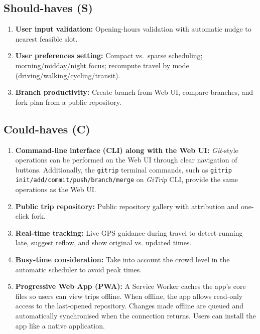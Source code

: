 \documentclass{article}
\begin{document}
\subsection*{Should-haves (S)}
\begin{enumerate}[label=\textbf{S\arabic*}]
  \item \textbf{User input validation:} Opening-hours validation with automatic nudge to nearest feasible slot.
  \item \textbf{User preferences setting:} Compact vs.\ sparse scheduling; morning/midday/night focus; recompute travel by mode (driving/walking/cycling/transit).
  \item \textbf{Branch productivity:} Create branch from Web UI, compare branches, and fork plan from a public repository.
\end{enumerate}

\subsection*{Could-haves (C)}
\begin{enumerate}[label=\textbf{C\arabic*}]
  \item \textbf{Command-line interface (CLI) along with the Web UI:} \textit{Git}-style operations can be performed on the Web UI through clear navigation of buttons. Additionally, the \texttt{gitrip} terminal commands, such as \texttt{gitrip init/add/commit/push/branch/merge} on \textit{GiTrip} CLI, provide the same operations as the Web UI.
  \item \textbf{Public trip repository:} Public repository gallery with attribution and one-click fork.
  \item \textbf{Real-time tracking:} Live GPS guidance during travel to detect running late, suggest reflow, and show original vs. updated times.
  \item \textbf{Busy-time consideration:} Take into account the crowd level in the automatic scheduler to avoid peak times.
  \item \textbf{Progressive Web App (PWA):} A Service Worker caches the app's core files so users can view trips offline. When offline, the app allows read-only access to the last-opened repository. Changes made offline are queued and automatically synchronised when the connection returns. Users can install the app like a native application.
\end{enumerate}
\end{document}
